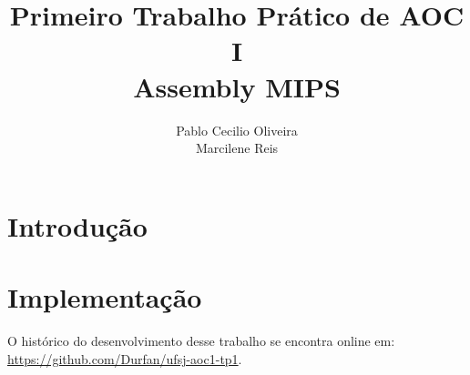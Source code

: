 \documentclass[12pt,a4paper]{article}
\author{Pablo Cecilio Oliveira\\
Marcilene Reis}
\title{Primeiro Trabalho Prático de AOC I\\
Assembly MIPS}
\date{}
\begin{document}
\maketitle


\section{Introdução}


\section{Implementação}






\begin{flushleft}
	\nocite{*}
	
	\vfill
	O histórico do desenvolvimento desse trabalho se encontra online em:\\ \url{https://github.com/Durfan/ufsj-aoc1-tp1}.
\end{flushleft}
\end{document}
